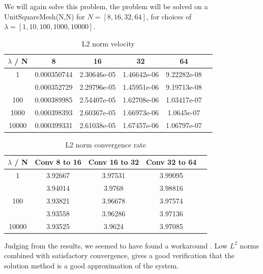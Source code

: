 \documentclass[a4paper,norsk]{article}
\begin{document}
We will again solve this problem, the problem will be solved on a UnitSquareMesh(N,N) for $N = [8, 16, 32, 64]$, for 
choices of $\lambda = [1, 10, 100, 1000, 10000]$. 
\begin{table}[ht]
\caption {L2 norm velocity} 
\centering
\begin{tabular}{c|ccccc}
\hline
\rowcolor{LightCyan}
$\lambda$ / N  & 8 & 16 & 32 & 64\\
\hline
1     & 0.000350744 & 2.30646e-05 & 1.46642e-06 & 9.22282e-08 \\ \hline
\rowcolor{LightCyan} \hline
10    & 0.000352729 & 2.29796e-05 & 1.45951e-06 & 9.19713e-08 \\ \hline
100   & 0.000389985 & 2.54407e-05 & 1.62708e-06 & 1.03417e-07 \\ \hline
\rowcolor{LightCyan} 
1000  & 0.000398393 & 2.60367e-05 & 1.66973e-06 & 1.0645e-07  \\ \hline
10000 & 0.000399331 & 2.61038e-05 & 1.67457e-06 & 1.06797e-07 \\
\hline
\end{tabular}
\end{table}
\begin{table}[ht]
\caption {L2 norm convergence rate} 
\centering
\begin{tabular}{c|cccc}
\hline
\rowcolor{LightCyan}
$\lambda$ / N  & Conv 8 to 16  &  Conv 16 to 32 &  Conv 32 to 64 \\
\hline
1     & 3.92667 & 3.97531 & 3.99095 &  \\ \hline
\rowcolor{LightCyan} \hline
10    & 3.94014 & 3.9768  & 3.98816 &  \\ \hline
100   & 3.93821 & 3.96678 & 3.97574 &  \\ \hline
\rowcolor{LightCyan} \hline
1000  & 3.93558 & 3.96286 & 3.97136 &  \\ \hline
10000 & 3.93525 & 3.9624  & 3.97085 &  \\
\hline
\end{tabular}
\end{table}
Judging from the results, we seemed to have found a workaround . Low $L^2$ norms combined with satisfactory
convergence, gives a good verification that the solution method is a good approximation of the system. 
        
\end{document}
